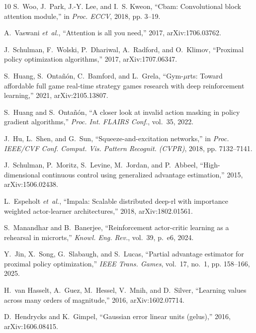 \documentclass[conference]{IEEEtran}
\begin{document}
\begin{thebibliography}{10}
S.~Woo, J.~Park, J.-Y. Lee, and I.~S. Kweon, ``Cbam: Convolutional block
  attention module,'' in \emph{Proc. ECCV}, 2018, pp. 3--19.

A.~Vaswani \emph{et~al.}, ``Attention is all you need,'' 2017,
  arXiv:1706.03762.

J.~Schulman, F.~Wolski, P.~Dhariwal, A.~Radford, and O.~Klimov, ``Proximal
  policy optimization algorithms,'' 2017, arXiv:1707.06347.

S.~Huang, S.~Onta{\~n}{\'o}n, C.~Bamford, and L.~Grela, ``Gym-$\mu$rts: Toward
  affordable full game real-time strategy games research with deep
  reinforcement learning,'' 2021, arXiv:2105.13807.

S.~Huang and S.~Onta{\~n}{\'o}n, ``A closer look at invalid action masking in
  policy gradient algorithms,'' \emph{Proc. Int. FLAIRS Conf.}, vol.~35, 2022.

J.~Hu, L.~Shen, and G.~Sun, ``Squeeze-and-excitation networks,'' in \emph{Proc.
  IEEE/CVF Conf. Comput. Vis. Pattern Recognit. (CVPR)}, 2018, pp. 7132--7141.

J.~Schulman, P.~Moritz, S.~Levine, M.~Jordan, and P.~Abbeel, ``High-dimensional
  continuous control using generalized advantage estimation,'' 2015,
  arXiv:1506.02438.

L.~Espeholt \emph{et~al.}, ``Impala: Scalable distributed deep-rl with
  importance weighted actor-learner architectures,'' 2018, arXiv:1802.01561.

S.~Manandhar and B.~Banerjee, ``Reinforcement actor-critic learning as a
  rehearsal in microrts,'' \emph{Knowl. Eng. Rev.}, vol.~39, p.~e6, 2024.

Y.~Jin, X.~Song, G.~Slabaugh, and S.~Lucas, ``Partial advantage estimator for
  proximal policy optimization,'' \emph{IEEE Trans. Games}, vol.~17, no.~1, pp.
  158--166, 2025.

H.~van Hasselt, A.~Guez, M.~Hessel, V.~Mnih, and D.~Silver, ``Learning values
  across many orders of magnitude,'' 2016, arXiv:1602.07714.

D.~Hendrycks and K.~Gimpel, ``Gaussian error linear units (gelus),'' 2016,
  arXiv:1606.08415.


\end{thebibliography}
\end{document}
